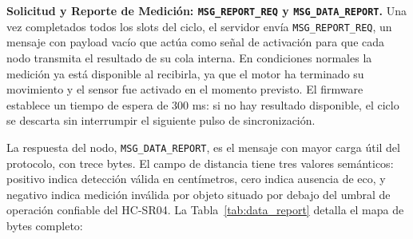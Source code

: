 \begin{table}[H]
\centering
{}
\vspace{6pt}
\caption{Mapa de bytes de \texttt{MSG\_SLOT\_ASSIGN}.}
\label{tab:slot_assign}
\end{table}

\textbf{Solicitud y Reporte de Medición: \texttt{MSG\_REPORT\_REQ} y \texttt{MSG\_DATA\_REPORT}.} Una vez completados todos los slots del ciclo, el servidor envía \texttt{MSG\_REPORT\_REQ}, un mensaje con payload vacío que actúa como señal de activación para que cada nodo transmita el resultado de su cola interna. En condiciones normales la medición ya está disponible al recibirla, ya que el motor ha terminado su movimiento y el sensor fue activado en el momento previsto. El firmware establece un tiempo de espera de 300 ms: si no hay resultado disponible, el ciclo se descarta sin interrumpir el siguiente pulso de sincronización.

La respuesta del nodo, \texttt{MSG\_DATA\_REPORT}, es el mensaje con mayor carga útil del protocolo, con trece bytes. El campo de distancia tiene tres valores semánticos: positivo indica detección válida en centímetros, cero indica ausencia de eco, y negativo indica medición inválida por objeto situado por debajo del umbral de operación confiable del HC-SR04. La Tabla~\ref{tab:data_report} detalla el mapa de bytes completo:

